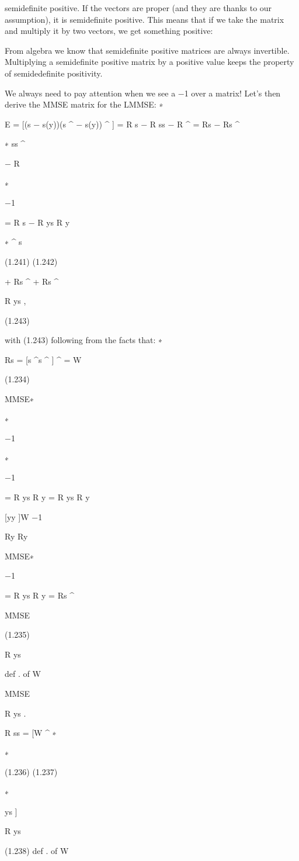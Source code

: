 {semidefinite positive. If the vectors are proper (and they are thanks to our assumption), it is semidefinite positive.
This means that if we take the matrix and multiply it by two vectors, we get something positive:

From algebra we know that semidefinite positive matrices are always invertible.
Multiplying a semidefinite positive matrix by a positive value keeps the property of semidedefinite positivity.

We always need to pay attention when we see a −1 over a matrix!
Let's then derive the MMSE matrix for the LMMSE:
∗

E = [(s − s(y))(s
^
− s(y))
^
]
= R s − R ss
− R
^
= Rs − Rs
^

∗
ss
^

− R

∗

−1

= R s − R ys R y

∗
^
s

(1.241)
(1.242)

+ Rs
^
+ Rs
^

R ys ,

(1.243)

with (1.243) following from the facts that:
∗

Rs
= [s
^s
^ ]
^
= W

(1.234)

MMSE∗

∗

−1

∗

−1

= R ys R y
= R ys R y

[yy ]W
−1

Ry Ry

MMSE∗

−1

= R ys R y
= Rs
^

MMSE

(1.235)

R ys

def . of W

MMSE

R ys .

R ss
= [W
^
∗

∗

(1.236)
(1.237)

∗

ys ]

R ys

(1.238)
def . of W

}
